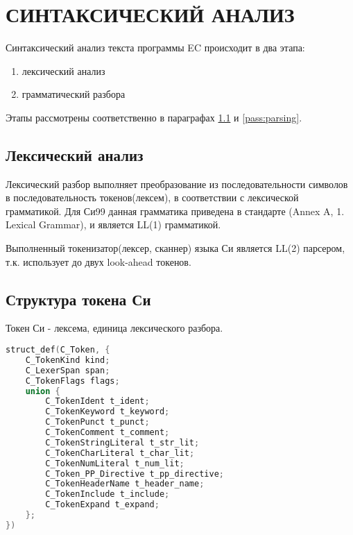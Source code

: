 
\chapter{СИНТАКСИЧЕСКИЙ АНАЛИЗ}

Синтаксический анализ текста программы EC происходит в два этапа: 
\begin{enumerate}
    \item лексический анализ
    \item грамматический разбора
\end{enumerate}

Этапы рассмотрены соответственно в параграфах \ref{pass:lexing} и \ref{pass:parsing}.

\section{Лексический анализ}
\label{pass:lexing}

Лексический разбор выполняет преобразование из последовательности символов в последовательность токенов(лексем), в соответствии с лексической грамматикой.
Для Си99 данная грамматика приведена в стандарте\cite{c99_std} (Annex A, 1. Lexical Grammar), и является LL(1) грамматикой.

Выполненный токенизатор(лексер, сканнер) языка Си является LL(2) парсером, т.к. использует до двух look-ahead токенов.

\section{Структура токена Си}

Токен Си - лексема, единица лексического разбора.

\begin{lstlisting}[language=c, caption={Структура токена Си}, label={lexing:c-token-struct}]
struct_def(C_Token, {
    C_TokenKind kind;
    C_LexerSpan span;
    C_TokenFlags flags;
    union {
        C_TokenIdent t_ident;
        C_TokenKeyword t_keyword;
        C_TokenPunct t_punct;
        C_TokenComment t_comment;
        C_TokenStringLiteral t_str_lit;
        C_TokenCharLiteral t_char_lit;
        C_TokenNumLiteral t_num_lit;
        C_Token_PP_Directive t_pp_directive;
        C_TokenHeaderName t_header_name;
        C_TokenInclude t_include;
        C_TokenExpand t_expand;
    };
})
\end{lstlisting}

